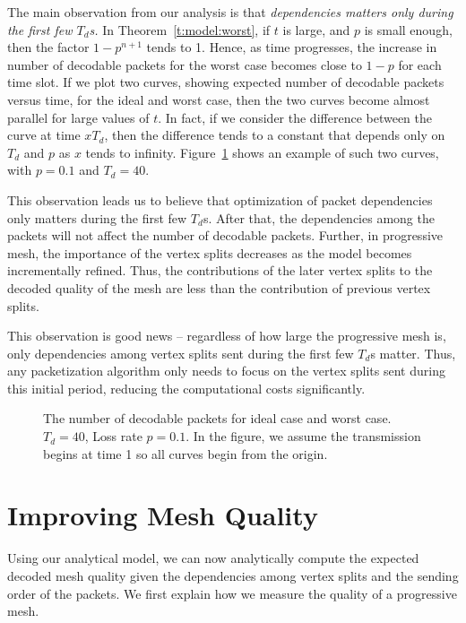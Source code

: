     
    The main observation from our analysis is that \textit{
    dependencies matters only during the first few $T_d$s.}
    In Theorem~\ref{t:model:worst}, if $t$ is large, and $p$ is small
    enough, then the factor $1-p^{n+1}$ tends to 1.  Hence, as
    time progresses, the increase in number of decodable packets
    for the worst case becomes close to $1-p$ for each time slot.
    If we plot two curves, showing expected number of decodable
    packets versus time, for the ideal and worst case, then the
    two curves become almost parallel for large values of $t$.  In fact,
    if we consider the difference between the curve at time $xT_d$,
    then the difference tends to a constant that depends only on
    $T_d$ and $p$ as $x$ tends to infinity.
    Figure~\ref{model:extreme} shows an example of such two curves, with
    $p = 0.1$ and $T_d = 40$.

    This observation leads us to believe that optimization of
    packet dependencies only matters during the first few $T_d$s. 
    After that, the dependencies among the packets will not affect
    the number of decodable packets.  Further, in progressive mesh,
    the importance of the vertex splits decreases as the model becomes
    incrementally refined.  Thus, the contributions of the later vertex
    splits to the decoded quality of the mesh are less than the contribution
    of previous vertex splits.

    This observation is good news -- regardless of how large the
    progressive mesh is, only dependencies among vertex splits sent during the
    first few $T_d$s matter.  Thus, any packetization
    algorithm only needs to focus on the vertex splits sent during
    this initial period, reducing the computational costs significantly.

\begin{figure}[htbp]
\centering
{}
\caption[The number of decodable packets for ideal case and worst case.]
        {The number of decodable packets for ideal case and worst case. $T_d= 40$, Loss rate $p =0.1$. In the figure, we assume the transmission begins at time 1 so all curves begin from the origin.}\label{model:extreme}
\end{figure}


\section{Improving Mesh Quality}
\label{s:model:quality}
    Using our analytical model, we can now analytically compute the
    expected decoded mesh quality given the dependencies among %
    vertex splits and %
    the sending order of the packets.
    We first explain how we measure the
    quality of a progressive mesh.
